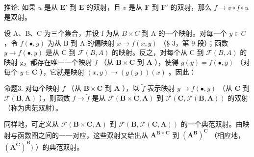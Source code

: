 推论. 如果 \(u\) 是从 \(\mathbf{E}'\) 到 \(\mathbf{E}\) 的双射，且 \(v\) 是从 \(\mathbf{F}\) 到 \(\mathbf{F}'\) 的双射，那么 \(f \to v \circ f \circ u\) 是双射。

设 A、B、C 为三个集合，并设 f 为从 \(B \times C\) 到 A 的一个映射。对每一个 \(y \in C\) ，令 \(f(\bullet, y)\) 为从 B 到 A 的偏映射 \(x \to f(x, y)\) （§ 3，第 9 段）；函数 \(y \to f(\bullet, y)\) 是从 C 到 \(\mathcal{F}(B, A)\) 的映射。反之，对每个从 C 到 \(\mathcal{F}(B, A)\) 的映射 g，都存在唯一一个映射 \(f\) （从 \(\mathbf{B} \times \mathbf{C}\) 到 \(\mathbf{A}\) ），使得 \(g(y) = f(\bullet, y)\) （对每个 \(y \in \mathbf{C}\) ），它就是映射 \((x, y) \to (g(y))(x)\) 。因此：

命题3. 对每个映射 \(f\) （从 \(\mathbf{B} \times \mathbf{C}\) 到 \(\mathbf{A}\) ），以 \(\tilde{f}\) 表示映射 \(y \to f(\bullet, y)\) （从 \(\mathbf{C}\) 到 \(\mathcal{F}(\mathbf{B}, \mathbf{A})\) ），则函数 \(f \to \tilde{f}\) 是从 \(\mathcal{F}(\mathbf{B} \times \mathbf{C}, \mathbf{A})\) 到 \(\mathcal{F}(\mathbf{C}, \mathcal{F}(\mathbf{B}, \mathbf{A}))\) 的双射（称为典范双射）。

同样地，可定义从 \(\mathcal{F}(\mathbf{B}\times\mathbf{C},\mathbf{A})\) 到 \(\mathcal{F}(\mathbf{B},\mathcal{F}(\mathbf{C},\mathbf{A}))\) 的一个典范双射。由映射与函数图之间的一一对应，这些双射又给出从 \(\mathbf{A}^{\mathbf{B}\times\mathbf{C}}\) 到 \((\mathbf{A}^{\mathbf{B}})^{\mathbf{C}}\) （相应地， \((\mathbf{A}^{\mathbf{C}})^{\mathbf{B}})\) ）的典范双射。

